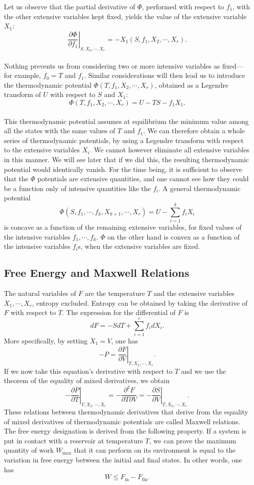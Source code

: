 Let us observe that the partial derivative of $\Phi$, performed with respect to $f_1$, with the other extensive variables kept fixed, yields the value of the extensive variable $X_1$:
\[ \left. \frac{\partial \Phi}{\partial f_1} \right|_{S,X_2,\cdots,X_r} = -X_1(S,f_1,X_2,\cdots,X_r).\]
\\
Nothing prevents us from considering two or more intensive variables as fixed—for example, $f_0 = T$ and $f_1$. Similar considerations will then lead us to introduce the thermodynamic potential $\Phi(T,f_1,X_2,\cdots,X_r)$, obtained as a Legendre transform of $U$ with respect to $S$ and $X_1$:
\[\Phi(T,f_1,X_2,\cdots,X_r) = U - TS - f_1X_1.\]
\\
This thermodynamic potential assumes at equilibrium the minimum value among all the states with the same values of $T$ and $f_1$. We can therefore obtain a whole series of thermodynamic potentials, by using a Legendre transform with respect to the extensive variables $X_i$. We cannot however eliminate all extensive variables in this manner. We will see later that if we did this, the resulting thermodynamic potential would identically vanish. For the time being, it is sufficient to observe that the $\Phi$ potentials are extensive quantities, and one cannot see how they could be a function only of intensive quantities like the $f_i$.
A general thermodynamic potential
\[\Phi(S,f_1,\cdots,f_k,X_{k+1},\cdots,X_r) = U - \sum_{i = 1}^{k} f_i X_i\]
is concave as a function of the remaining extensive variables, for fixed values of the intensive variables $f_1,\cdots,f_k$.
$\Phi$ on the other hand is convex as a function of the intensive variables $f_i$s, when the extensive variables are fixed.

\subsection{Free Energy and Maxwell Relations}
The natural variables of $F$ are the temperature $T$ and the extensive variables $X_1,\cdots,X_r$, entropy excluded. Entropy can be obtained by taking the derivative of $F$ with respect to $T$. The expression for the differential of $F$ is
\[dF = -SdT + \sum_{i = 1}^{r} f_i dX_i.\]
More specifically, by setting $X_1 = V$, one has
\[-P =\left. \frac{\partial F}{\partial V} \right|_{T,X_2,\cdots,X_r}.\]
If we now take this equation's derivative with respect to $T$ and we use the theorem of the equality of mixed derivatives, we obtain
\[\left. -\frac{\partial P}{\partial T} \right|_{V,X_2,\cdots,X_r} = -\frac{\partial^2 F}{\partial T \partial V} = \left. -\frac{\partial S}{\partial V} \right|_{T,X_2,\cdots,X_r}.\]
These relations between thermodynamic derivatives that derive from the equality of mixed derivatives of thermodynamic potentials are called Maxwell relations.
The free energy designation is derived from the following property. If a system is put in contact with a reservoir at temperature $T$, we can prove the maximum quantity of work $W_{\mathrm{max}}$ that it can perform on its environment is equal to the variation in free energy between the initial and final states. In other words, one has
\[W \leq F_{\mathrm{in}} - F_{\mathrm{fin}}.\]

